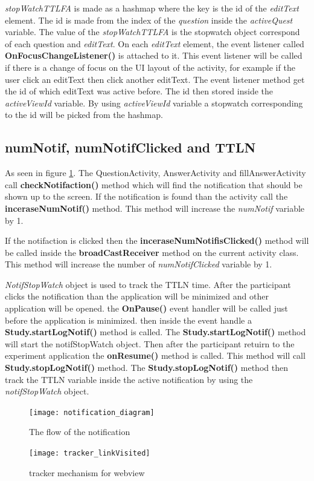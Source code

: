 \textit{stopWatchTTLFA} is made as a hashmap where the key is the id of the \textit{editText} element.
The id is made from the index of the \textit{question} inside the \textit{activeQuest} variable.
The value of the \textit{stopWatchTTLFA} is the stopwatch object correspond of each question and \textit{editText}.
On each \textit{editText} element, the event listener called \textbf{OnFocusChangeListener()} is attached to it. This event listener will be called if there is a
change of focus on the UI layout of the activity, for example if the user click an editText then click another editText. The event listener
 method get the id of which editText was active before. The id then stored inside the \textit{activeViewId} variable.
By using \textit{activeViewId} variable a stopwatch corresponding to the id will be picked from the hashmap.


\subsection{numNotif, numNotifClicked and TTLN}
As seen in figure \ref{fig:NotificationFlo}. The QuestionActivity, AnswerActivity and fillAnswerActivity  call \textbf{checkNotifaction()} method
which will find the notification that should be shown up to the screen. If the notification is found than the activity call the \textbf{inceraseNumNotif()} method.
This method will increase the \textit{numNotif} variable by 1.

If the notifaction is clicked then the \textbf{inceraseNumNotifisClicked()} method will be called inside the \textbf{broadCastReceiver} method on the current activity class.
This method will increase the number of \textit{numNotifClicked} variable by 1.

\textit{NotifStopWatch} object is used to track the TTLN time.
After the participant clicks the notification than the application will be minimized and other
application will be opened.
 the \textbf{OnPause()} event handler will be called just before the application is minimized.
then inside the event handle a \textbf{Study.startLogNotif()} method is called. The \textbf{Study.startLogNotif()}  method will start the notifStopWatch object.
Then after the participant retuirn to the experiment application the \textbf{onResume()} method is called.
This method will call \textbf{Study.stopLogNotif()} method.
The \textbf{Study.stopLogNotif()} method then track the TTLN variable inside the active notification
by using the \textit{notifStopWatch} object.


\begin{figure}
\begin{center}
\texttt{[image: notification\_diagram]}
\end{center}
\caption{The flow of the notification}
\label{fig:NotificationFlo}
\end{figure}
%
\begin{figure}
\begin{center}
\texttt{[image: tracker\_linkVisited]}
\end{center}
\caption{tracker mechanism for webview}
\label{fig:webViewTrack}
\end{figure}
